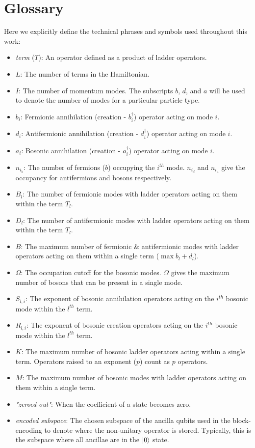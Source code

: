 \section{Glossary}
\label{sec:glossary}

Here we explicitly define the technical phrases and symbols used throughout this work:

\begin{itemize}
    \item \textit{term} ($T$): An operator defined as a product of ladder operators.
    \item $L$: The number of terms in the Hamiltonian.
    \item $I$: The number of momentum modes. The subscripts $b$, $d$, and $a$ will be used to denote the number of modes for a particular particle type.
    \item $b_i$: Fermionic annihilation (creation - $b_i^\dagger$) operator acting on mode $i$.
    \item $d_i$: Antifermionic annihilation (creation - $d_i^\dagger$) operator acting on mode $i$.
    \item $a_i$: Bosonic annihilation (creation - $a_i^\dagger$) operator acting on mode $i$.
    \item $n_{i_b}$: The number of fermions ($b$) occupying the $i^{th}$ mode. $n_{i_d}$ and $n_{i_a}$ give the occupancy for antifermions and bosons respectively.
    \item $B_l$: The number of fermionic modes with ladder operators acting on them within the term $T_l$.
    \item $D_l$: The number of antifermionic modes with ladder operators acting on them within the term $T_l$.
    \item $B$: The maximum number of fermionic \& antifermionic modes with ladder operators acting on them within a single term ($\max{b_l + d_l}$).
    \item $\Omega$: The occupation cutoff for the bosonic modes. $\Omega$ gives the maximum number of bosons that can be present in a single mode. 
    \item $S_{l, i}$: The exponent of bosonic annihilation operators acting on the $i^{th}$ bosonic mode within the $l^{th}$ term.
    \item $R_{l, i}$: The exponent of bosonic creation operators acting on the $i^{th}$ bosonic mode within the $l^{th}$ term.
    \item $K$: The maximum number of bosonic ladder operators acting within a single term. Operators raised to an exponent ($p$) count as $p$ operators.
    \item $M$: The maximum number of bosonic modes with ladder operators acting on them within a single term.
    \item \textit{"zeroed-out"}: When the coefficient of a state becomes zero.
    \item \textit{encoded subspace}: The chosen subspace of the ancilla qubits used in the block-encoding to denote where the non-unitary operator is stored. Typically, this is the subspace where all ancillae are in the $\ket{0}$ state.
\end{itemize}